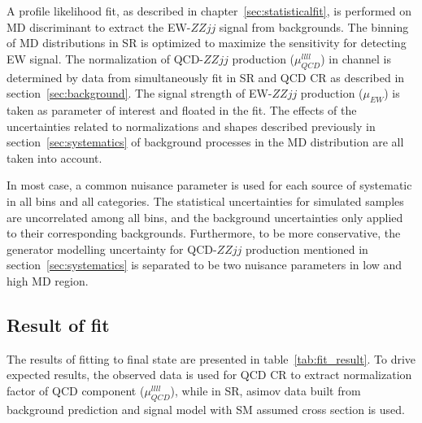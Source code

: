 A profile likelihood fit, as described in chapter~\ref{sec:statisticalfit}, is performed on MD discriminant to extract the EW-$ZZjj$ signal from backgrounds.
The binning of MD distributions in SR is optimized to maximize the sensitivity for detecting EW signal.
The normalization of QCD-$ZZjj$ production ($\mu_{QCD}^{llll}$) in \llll channel is determined by data from simultaneously fit in SR and QCD CR as described in section~\ref{sec:background}.
The signal strength of EW-$ZZjj$ production ($\mu_{EW}$) is taken as parameter of interest and floated in the fit.
The effects of the uncertainties related to normalizations and shapes described previously in section~\ref{sec:systematics} 
of background processes in the MD distribution are all taken into account.

In most case, a common nuisance parameter is used for each source of systematic in all bins and all categories.
The statistical uncertainties for simulated samples are uncorrelated among all bins, and the background uncertainties only applied to their corresponding backgrounds.
Furthermore, to be more conservative, the generator modelling uncertainty for QCD-$ZZjj$ production mentioned in section~\ref{sec:systematics}
is separated to be two nuisance parameters in low and high MD region.

\subsection{Result of fit}

The results of fitting to \llll final state are presented in table~\ref{tab:fit_result}. %
To drive expected results, the observed data is used for QCD CR to extract normalization factor of QCD component ($\mu_{QCD}^{llll}$),
while in SR, asimov data built from background prediction and signal model with SM assumed cross section is used.

